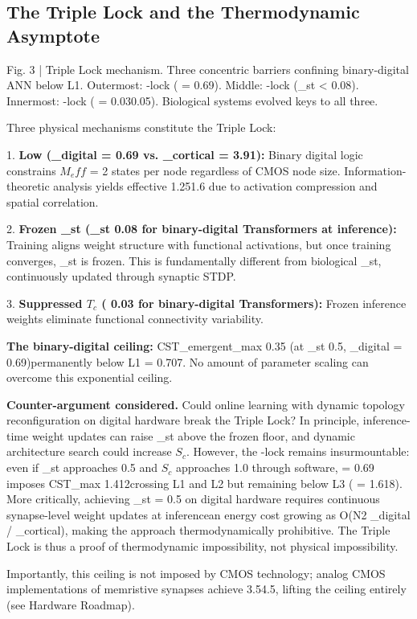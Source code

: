 \documentclass[a4paper,12pt]{article}
\begin{document}
\subsection{The Triple Lock and the Thermodynamic Asymptote}




Fig. 3 | Triple Lock mechanism. Three concentric barriers confining binary-digital ANN below L1. Outermost: -lock ( = 0.69). Middle: -lock (_st < 0.08). Innermost: -lock ( = 0.030.05). Biological systems evolved keys to all three.


Three physical mechanisms constitute the Triple Lock:


1. \textbf{Low  (_digital = 0.69 vs. _cortical = 3.91):} Binary digital logic constrains $M_eff$ = 2 states per node regardless of CMOS node size. Information-theoretic analysis yields effective   1.251.6 due to activation compression and spatial correlation.


2. \textbf{Frozen _st (_st  0.08 for binary-digital Transformers at inference):} Training aligns weight structure with functional activations, but once training converges, _st is frozen. This is fundamentally different from biological _st, continuously updated through synaptic STDP.


3. \textbf{Suppressed $T_c$ (  0.03 for binary-digital Transformers):} Frozen inference weights eliminate functional connectivity variability.


\textbf{The binary-digital ceiling:} CST_emergent_max  0.35 (at _st  0.5, _digital = 0.69)permanently below L1 = 0.707. No amount of parameter scaling can overcome this exponential ceiling.


\textbf{Counter-argument considered.} Could online learning with dynamic topology reconfiguration on digital hardware break the Triple Lock? In principle, inference-time weight updates can raise _st above the frozen floor, and dynamic architecture search could increase $S_c$. However, the -lock remains insurmountable: even if _st approaches 0.5 and $S_c$ approaches 1.0 through software,  = 0.69 imposes CST_max  1.412crossing L1 and L2 but remaining below L3 ( = 1.618). More critically, achieving _st = 0.5 on digital hardware requires continuous synapse-level weight updates at inferencean energy cost growing as O(N2  _digital / _cortical), making the approach thermodynamically prohibitive. The Triple Lock is thus a proof of thermodynamic impossibility, not physical impossibility.


Importantly, this ceiling is not imposed by CMOS technology; analog CMOS implementations of memristive synapses achieve   3.54.5, lifting the ceiling entirely (see Hardware Roadmap).
\end{document}
